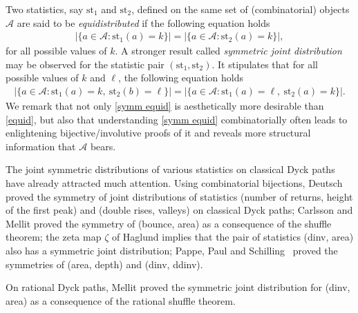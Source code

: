 \documentclass[11pt,a4paper,reqno]{article}
\newcommand{\st}{\mathrm{st}}
\newcommand{\cA}{\mathcal{A}}
\newcommand{\LiLan}{}
\begin{document}
	Two statistics, say $\st_1$ and $\st_2$, defined on the same set of (combinatorial) objects $\cA$ are said to be {\it equidistributed} if the following equation holds
	\begin{align}\label{equid}
	|\{a\in\cA: \st_1(a)=k\}|=|\{a\in\cA: \st_2(a)=k\}|,
	\end{align}
	for all possible values of $k$. A stronger result called {\it symmetric joint distribution} may be observed for the statistic pair $(\st_1,\st_2)$. It stipulates that for all possible values of $k$ and $\ell$, the following equation holds
	\begin{align}\label{symm equid}
	|\{a\in\cA: \st_1(a)=k,\ \st_2(b)=\ell\}|=|\{a\in\cA: \st_1(a)=\ell,\ \st_2(a)=k\}|.
	\end{align}
	We remark that not only \eqref{symm equid} is aesthetically more desirable than \eqref{equid}, but also that understanding \eqref{symm equid} combinatorially often leads to enlightening bijective/involutive proofs of it and reveals more structural information that $\cA$ bears.

	The joint symmetric distributions of various statistics on classical Dyck paths have already attracted much attention. Using combinatorial bijections, Deutsch \cite{Deu2} proved the symmetry of joint distributions of 
statistics (number of returns, height of the first peak) and (double rises, valleys) on classical 
Dyck paths; Carlsson and Mellit \cite{Car} proved the symmetry of (bounce, area) as a consequence of the shuffle 
theorem; the zeta map $\zeta$ of Haglund \cite{Ha} implies that {\LiLan the pair of statistics (dinv, area) also has a symmetric joint distribution;} Pappe, Paul and Schilling~\cite{Pa} proved the symmetries of (area, depth) and (dinv, ddinv).
    
	On rational Dyck paths, Mellit \cite{Mellit} proved the {symmetric joint distribution for (dinv, area)} as a consequence of the rational shuffle theorem.
	
	

	

    
    
\end{document}
